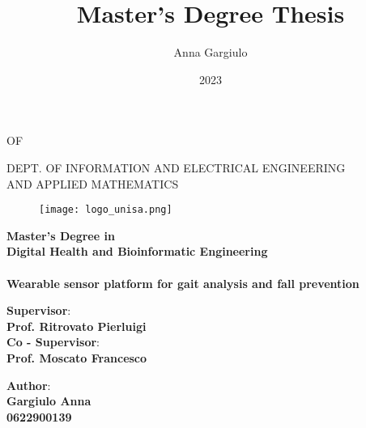\documentclass[a4paper, 12pt, oneside, hidelinks]{book}
\title{Master's Degree Thesis}
\author{Anna Gargiulo}
\date{2023}
\begin{document}
\begin{titlepage}

    \begin{center}
        {\Large\textsc{\scalebox{1.2}{University}}} 
        {\Large\textsc{{OF}}} 
        {\Large\textsc{\scalebox{1.2}{Salerno}}}     
        \noindent\vspace{4mm}
        
    	\uppercase{\normalsize Dept. of Information and Electrical Engineering \\and Applied Mathematics }\\
    \end{center}
    
    \begin{figure}[H]
        \centering
        \texttt{[image: logo\_unisa.png]}
    \end{figure}
    
    \begin{center}
    	\normalsize{\textbf{Master's Degree in \\Digital Health and Bioinformatic Engineering \\}}
        \small{\textbf{\\}}
    	\vspace{15mm}
        {\Large{\bf Wearable sensor platform for gait analysis and fall prevention}}\\
    	\vspace{3mm}
    \end{center}
    
    \vspace{15mm}
    \noindent
    \begin{minipage}[t]{0.47\textwidth}
    	{\large{ \textbf{Supervisor}:\\\bf Prof. Ritrovato Pierluigi}}
    	\vspace{2mm}\\
     {\large{ \textbf{Co - Supervisor}:\\\bf Prof. Moscato Francesco}}
    \end{minipage}
    \hfill
    \begin{minipage}[t]{0.4\textwidth}\raggedleft
    	{\large{\textbf{Author}: \\ \bf Gargiulo Anna\\ 0622900139}}
    \end{minipage}
    
    \vspace{20mm}
    

\end{titlepage}

\end{document}
